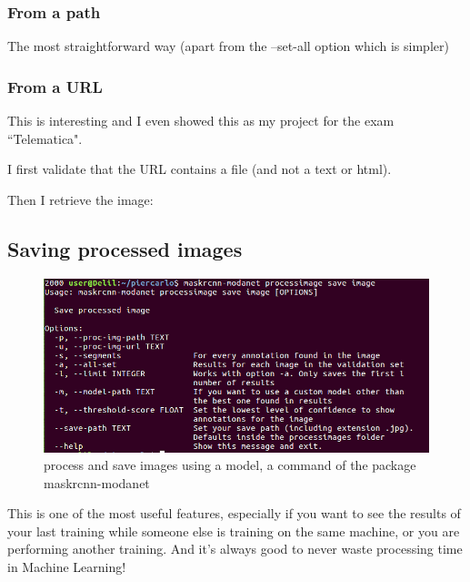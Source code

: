 \subsubsection{From a path}

The most straightforward way (apart from the --set-all option which is simpler)

\subsubsection{From a URL}

This is interesting and I even showed this as my project for the exam “Telematica".

I first validate that the URL contains a file (and not a text or html).



Then I retrieve the image:



\subsection{Saving processed images}

\begin{figure}[H]
	\centering
	\includegraphics[width=\linewidth]{figures/cli/processimagesaveimage}
	\caption{process and save images using a model, a command of the package maskrcnn-modanet}
	\label{f:cli-processimagesaveimage}
\end{figure}

This is one of the most useful features, especially if you want to see the results of your last training while someone else is training on the same machine, or you are performing another training. And it's always good to never waste processing time in Machine Learning!

